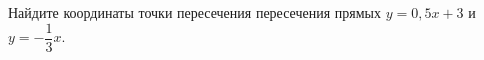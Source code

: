 \begin{ex}
	\begin{condition}
		Найдите координаты точки пересечения пересечения прямых \( y=0,5x+3 \) и \( y=-\dfrac{1}{3}x \).
	\end{condition}
\end{ex}